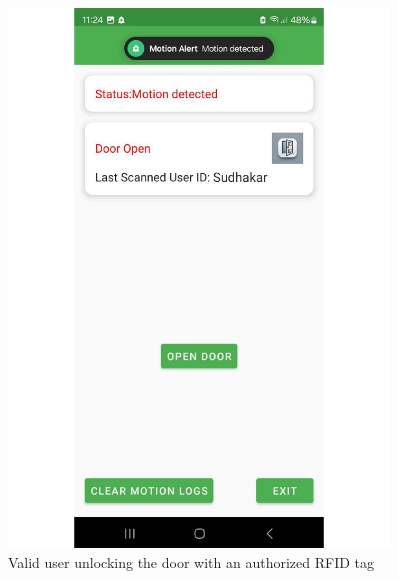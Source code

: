 \documentclass[a4paper]{scrartcl}
\begin{document}
\begin{figure}[h]
    \centering
    

    \begin{minipage}{0.45\textwidth}
        \centering
        \includegraphics[width=0.9\textwidth]{user.pdf}
        \caption{Valid user unlocking the door with an authorized RFID tag}
        \label{fig:user}
    \end{minipage}
    \hfill
    \begin{minipage}{0.45\textwidth}
        \centering

\end{minipage}
\end{figure}
\end{document}

